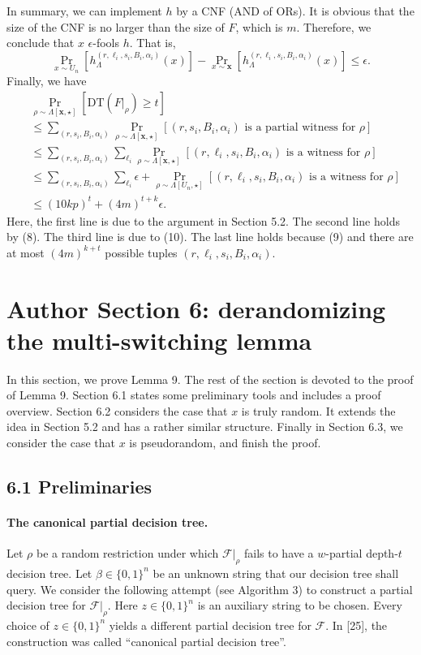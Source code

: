 \documentclass[10pt,a4paper]{article}
\begin{document}
In summary, we can implement $h$ by a CNF (AND of ORs). It is obvious that the size of the CNF is no larger than the size of $F$, which is $m$. Therefore, we conclude that $x$ $\epsilon$-fools $h$. That is,
\[\Pr_{x\sim U_n}[h_\Lambda^{(r,\ell_i,s_i,B_i,\alpha_i)}(x)]-\Pr_{x\sim\boldsymbol x}[h_\Lambda^{(r,\ell_i,s_i,B_i,\alpha_i)}(x)]\le\epsilon.\tag{10}\]
Finally, we have
\begin{align*}&\Pr_{\rho\sim\Lambda[\boldsymbol x,\star]}[\mathrm{DT}(F|_\rho)\ge t]\\&\le\sum_{(r,s_i,B_i,\alpha_i)}\Pr_{\rho\sim\Lambda[\boldsymbol x,\star]}[(r,s_i,B_i,\alpha_i)\text{ is a partial witness for }\rho]\\&\le\sum_{(r,s_i,B_i,\alpha_i)}\sum_{\ell_i}\Pr_{\rho\sim\Lambda[\boldsymbol x,\star]}[(r,\ell_i,s_i,B_i,\alpha_i)\text{ is a witness for }\rho]\\&\le\sum_{(r,s_i,B_i,\alpha_i)}\sum_{\ell_i}\epsilon+\Pr_{\rho\sim\Lambda[U_n,\star]}[(r,\ell_i,s_i,B_i,\alpha_i)\text{ is a witness for }\rho]\\&\le(10kp)^t+(4m)^{t+k}\epsilon.\end{align*}
Here, the first line is due to the argument in Section 5.2. The second line holds by (8). The third line is due to (10). The last line holds because (9) and there are at most $(4m)^{k+t}$ possible tuples $(r,\ell_i,s_i,B_i,\alpha_i)$.

\section*{Author Section 6: derandomizing the multi-switching lemma}
In this section, we prove Lemma 9. The rest of the section is devoted to the proof of Lemma 9. Section 6.1 states some preliminary tools and includes a proof overview. Section 6.2 considers the case that $x$ is truly random. It extends the idea in Section 5.2 and has a rather similar structure. Finally in Section 6.3, we consider the case that $x$ is pseudorandom, and finish the proof.
\subsection*{6.1 Preliminaries}
\paragraph{The canonical partial decision tree.} Let $\rho$ be a random restriction under which $\mathcal F|_\rho$ fails to have a $w$-partial depth-$t$ decision tree. Let $\beta\in\{0,1\}^n$ be an unknown string that our decision tree shall query. We consider the following attempt (see Algorithm 3) to construct a partial decision tree for $\mathcal F|_\rho$. Here $z\in\{0,1\}^n$ is an auxiliary string to be chosen. Every choice of $z\in\{0,1\}^n$ yields a different partial decision tree for $\mathcal F$. In [25], the construction was called ``canonical partial decision tree''.
\end{document}

